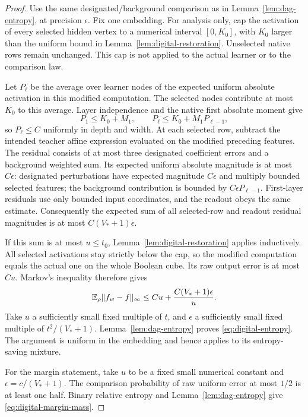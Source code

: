 \begin{proof}
Use the same designated/background comparison as in Lemma~\ref{lem:dag-entropy}, at precision $\epsilon$. Fix one embedding. For analysis only, cap the activation of every selected hidden vertex to a numerical interval $[0,K_0]$, with $K_0$ larger than the uniform bound in Lemma~\ref{lem:digital-restoration}. Unselected native rows remain unchanged. This cap is not applied to the actual learner or to the comparison law.

Let $P_\ell$ be the average over learner nodes of the expected uniform absolute activation in this modified computation. The selected nodes contribute at most $K_0$ to this average. Layer independence and the native first absolute moment give
\[
 P_1\le K_0+M_1,\qquad P_\ell\le K_0+M_1P_{\ell-1},
\]
so $P_\ell\le C$ uniformly in depth and width. At each selected row, subtract the intended teacher affine expression evaluated on the modified preceding features. The residual consists of at most three designated coefficient errors and a background weighted sum. Its expected uniform absolute magnitude is at most $C\epsilon$: designated perturbations have expected magnitude $C\epsilon$ and multiply bounded selected features; the background contribution is bounded by $C\epsilon P_{\ell-1}$. First-layer residuals use only bounded input coordinates, and the readout obeys the same estimate. Consequently the expected sum of all selected-row and readout residual magnitudes is at most $C(V_*+1)\epsilon$.

If this sum is at most $u\le t_0$, Lemma~\ref{lem:digital-restoration} applies inductively. All selected activations stay strictly below the cap, so the modified computation equals the actual one on the whole Boolean cube. Its raw output error is at most $Cu$. Markov's inequality therefore gives
\[
 \mathbb E_\rho\|f_w-f\|_\infty
 \le Cu+\frac{C(V_*+1)\epsilon}{u}.
\]
Take $u$ a sufficiently small fixed multiple of $t$, and $\epsilon$ a sufficiently small fixed multiple of $t^2/(V_*+1)$. Lemma~\ref{lem:dag-entropy} proves \eqref{eq:digital-entropy}. The argument is uniform in the embedding and hence applies to its entropy-saving mixture.

For the margin statement, take $u$ to be a fixed small numerical constant and $\epsilon=c/(V_*+1)$. The comparison probability of raw uniform error at most $1/2$ is at least one half. Binary relative entropy and Lemma~\ref{lem:dag-entropy} give \eqref{eq:digital-margin-mass}.
\end{proof}

